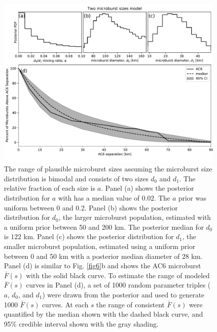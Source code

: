 \documentclass[draft]{agujournal2019}
\begin{document}
\begin{figure}
\includegraphics[width=\textwidth]{fig7.pdf}
\caption{The range of plausible microburst sizes assuming the microburst size distribution is bimodal and consists of two sizes $d_0$ and $d_1$. The relative fraction of each size is $a$. Panel (a) shows the posterior distribution for $a$ with has a median value of $0.02$. The $a$ prior was uniform between 0 and 0.2. Panel (b) shows the posterior distribution for $d_0$, the larger microburst population, estimated with a uniform prior between 50 and 200 km. The posterior median for $d_0$ is $122$ km. Panel (c) shows the posterior distribution for $d_1$, the smaller microburst population, estimated using a uniform prior between 0 and 50 km with a posterior median diameter of $28$ km. Panel (d) is similar to Fig. \ref{fig6}b and shows the AC6 microburst $\bar{F}(s)$ with the solid black curve. To estimate the range of modeled $\bar{F}(s)$ curves in Panel (d), a set of 1000 random parameter triples ($a$, $d_0$, and $d_1$) were drawn from the posterior and used to generate 1000 $\bar{F}(s)$ curves. At each $s$ the range of consistent $\bar{F}(s)$ were quantified by the median shown with the dashed black curve, and 95\% credible interval shown with the gray shading.} 
\label{fig7}
\end{figure}
\end{document}
